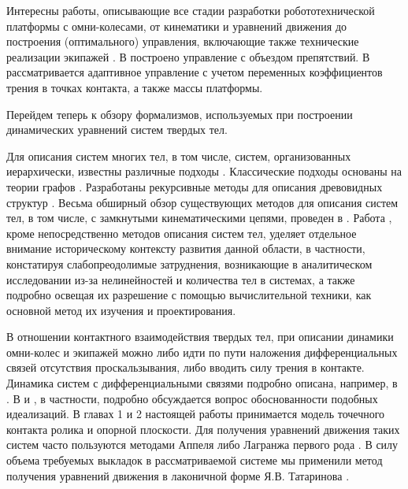 Интересны работы, описывающие все стадии разработки робототехнической платформы с омни-колесами, от кинематики и уравнений движения до построения (оптимального) управления, включающие также технические реализации экипажей \cite{Williams2002,Purwin2006,Li2009}. В \cite{Galicki2009} построено управление с объездом препятствий. В \cite{Lin2013} рассматривается адаптивное управление с учетом переменных коэффициентов трения в точках контакта, а также массы платформы.

Перейдем теперь к обзору формализмов, используемых при построении динамических уравнений систем твердых тел. 

Для описания систем многих тел, в том числе, систем, организованных иерархически, известны различные подходы \cite{Wittenburg2008,EberhardSchiehlen,Jain2011,Roberson1988,Jerkovsky1977}. Классические подходы основаны на теории графов \cite{Wittenburg2008,Jerkovsky1977}. Разработаны рекурсивные методы для описания древовидных структур \cite{EberhardSchiehlen}. Весьма обширный обзор существующих методов для описания систем тел, в том числе, с замкнутыми кинематическими цепями, проведен в \cite{Jain2011}. Работа \cite{Roberson1988}, кроме непосредственно методов описания систем тел, уделяет отдельное внимание историческому контексту развития данной области, в частности, констатируя слабопреодолимые затруднения, возникающие в аналитическом исследовании из-за нелинейностей и количества тел в системах, а также подробно освещая их разрешение с помощью вычислительной техники, как основной метод их изучения и проектирования.

В отношении контактного взаимодействия твердых тел, при описании динамики омни-колес и экипажей можно либо идти по пути наложения дифференциальных связей отсутствия проскальзывания, либо вводить силу трения в контакте. Динамика систем с дифференциальными связями подробно описана, например, в \cite{Chaplygin1949,NejmarkFufaev1967}. В \cite{NejmarkFufaev1967} и \cite{karapetyan1981negolonom}, в частности, подробно обсуждается вопрос обоснованности подобных идеализаций. В главах 1 и 2 настоящей работы принимается модель точечного контакта ролика и опорной плоскости. Для получения уравнений движения таких систем часто пользуются методами Аппеля либо Лагранжа первого рода \cite{KarapetyanKugushev2010,Appel1,AppelTwo1960}. В силу объема требуемых выкладок в рассматриваемой системе мы применили метод получения уравнений движения в лаконичной форме Я.В. Татаринова \cite{Tatarinov,Tatarinov2005}.

